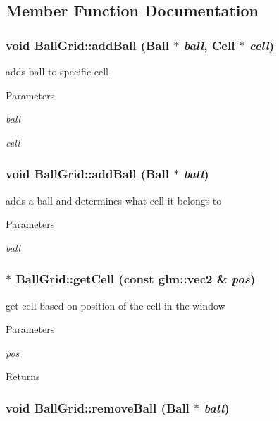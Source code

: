 \subsection{Member Function Documentation}
\hypertarget{classBallGrid_a1ee46472584ce1515e22d3a8b5c4f531}{
\subsubsection[{addBall}]{\setlength{\rightskip}{0pt plus 5cm}void BallGrid::addBall ({\bf Ball} $\ast$ {\em ball}, \/  {\bf Cell} $\ast$ {\em cell})}}
\label{classBallGrid_a1ee46472584ce1515e22d3a8b5c4f531}


adds ball to specific cell 
\begin{DoxyParams}{Parameters}
\item[{\em ball}]\item[{\em cell}]\end{DoxyParams}
\hypertarget{classBallGrid_ad3a834b61100b1ca532c47c8b3b68062}{
\subsubsection[{addBall}]{\setlength{\rightskip}{0pt plus 5cm}void BallGrid::addBall ({\bf Ball} $\ast$ {\em ball})}}
\label{classBallGrid_ad3a834b61100b1ca532c47c8b3b68062}


adds a ball and determines what cell it belongs to 
\begin{DoxyParams}{Parameters}
\item[{\em ball}]\end{DoxyParams}
\hypertarget{classBallGrid_a1c1b46810cee5738bc9cdcc98132f37e}{
\subsubsection[{getCell}]{ $\ast$ BallGrid::getCell (const glm::vec2 \& {\em pos})}}
\label{classBallGrid_a1c1b46810cee5738bc9cdcc98132f37e}


get cell based on position of the cell in the window 
\begin{DoxyParams}{Parameters}
\item[{\em pos}]\end{DoxyParams}
\begin{DoxyReturn}{Returns}

\end{DoxyReturn}
\hypertarget{classBallGrid_a468ea1f13fb2e2860e2d393a199a6116}{
\subsubsection[{removeBall}]{\setlength{\rightskip}{0pt plus 5cm}void BallGrid::removeBall ({\bf Ball} $\ast$ {\em ball})}}
\label{classBallGrid_a468ea1f13fb2e2860e2d393a199a6116}


